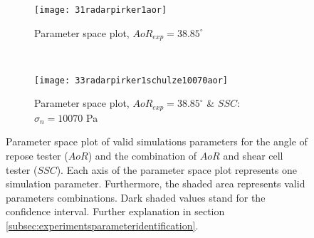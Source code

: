 \documentclass[review]{elsarticle}
\begin{document}
\begin{figure}[htp] \centering
    \begin{subfigure}[b]{0.96\columnwidth}
        \texttt{[image: 31radarpirker1aor]}
        \caption{Parameter space plot, $AoR_{exp} = 38.85 ^\circ$}
        \label{fig:31radarpirker1aor} 
    \end{subfigure}\\
        \begin{subfigure}[b]{0.96\columnwidth}
        \texttt{[image: 33radarpirker1schulze10070aor]}
        \caption{Parameter space plot, $AoR_{exp} = 38.85
        ^\circ$ \& $SSC$: $\sigma_n=10070$ Pa}
        \label{fig:33radarpirker1schulze10070aor} 
    \end{subfigure}
    \caption[Parameter space plot of valid simulations parameters for the AoR and
    the combination of AoR and SSC valid parameters]{Parameter space plot of
    valid simulations parameters for the angle of repose tester ($AoR$) and the
    combination of $AoR$ and shear cell tester ($SSC$).
    Each axis of the parameter space plot represents one simulation parameter.
    Furthermore, the shaded area represents valid parameters combinations.
    Dark shaded values stand for the confidence interval.
    Further explanation in section \ref{subsec:experimentsparameteridentification}.}
    \label{fig:35schulze10070aorradarandcloud}
\end{figure}
\end{document}
